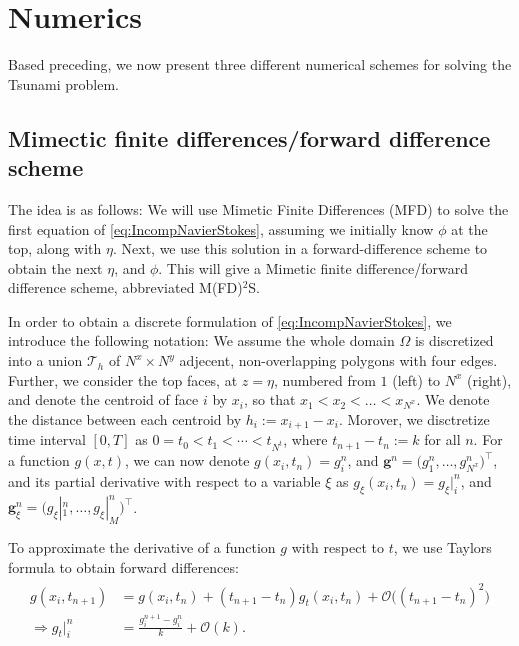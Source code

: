 \documentclass[11pt]{article}
\begin{document}
\section{Numerics}

Based preceding, we now present three different numerical schemes for solving the Tsunami problem.
%
%
\subsection{Mimectic finite differences/forward difference scheme}

The idea is as follows: We will use Mimetic Finite Differences (MFD) \cite{raynaud15} to solve the first equation of \eqref{eq:IncompNavierStokes}, assuming we initially know
$\phi$ at the top, along with $\eta$. Next, we use this solution in a forward-difference scheme to obtain the next $\eta$, and $\phi$. This will give a Mimetic finite
difference/forward difference scheme, abbreviated M(FD)$^2$S.

In order to obtain a discrete formulation of \eqref{eq:IncompNavierStokes}, we introduce the following notation:
We assume the whole domain $\Omega$ is discretized into a union $\mathcal{T}_h$ of $N^x \times N^y$ adjecent, non-overlapping
polygons with four edges. Further, we consider the top faces, at $z = \eta$, numbered from $1$ (left) to $N^x$ (right), and denote
the centroid of face $i$ by $x_i$, so that $x_1 < x_2 < \dots < x_{N^x}$. We denote the distance between each centroid by
$h_i := x_{i+1}-x_i$. Morover, we disctretize time interval $[0, T]$ as $0 = t_0 < t_1 < \cdots < t_{N^t}$, where $t_{n+1}-t_n := k$ for all $n$.
For a function $g(x,t)$, we can now denote $g(x_i, t_n) = g_i^n$, and $\bm{g}^n = \Big(g_1^n, \dots, g_{N^x}^n\Big)^\top$, and its partial derivative with respect
to a variable $\xi$ as $g_\xi(x_i, t_n) = g_{\xi}|_i^n$, and $\bm{g}_\xi^n = \Big(g_{\xi}|_1^n, \dots, g_{\xi}|_M^n\Big)^\top$.

To approximate the derivative of a function $g$ with respect to $t$, we use Taylors formula to obtain forward differences:
\begin{align}
    \label{eq:ForwardDiff}
    \begin{aligned}
	    g(x_i, t_{n+1})       & = g(x_i, t_n) +  (t_{n+1}-t_n)g_t(x_i, t_n) + \mathcal{O}\big((t_{n+1}-t_n)^2\big) \\
	    \Rightarrow g_t|_i^n & = \frac{g_i^{n+1}-g_i^n}{k} + \mathcal{O}(k).
	\end{aligned}
\end{align}
\end{document}
